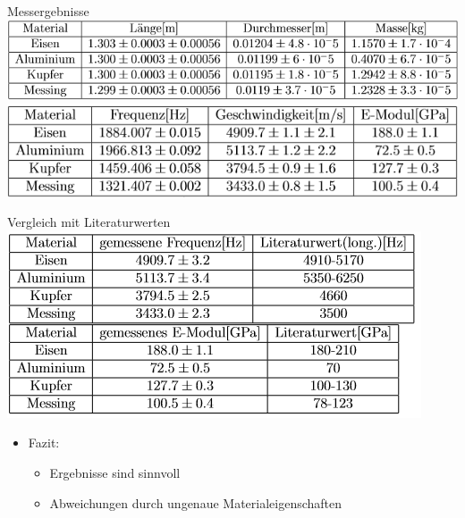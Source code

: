 \documentclass[12pt]{beamer}
\begin{document}
\begin{frame}{Messergebnisse}
\includegraphics[width=\linewidth,height=\textheight,keepaspectratio]{Bilder/Material_Metalle.PNG}\\
\includegraphics[width=\linewidth,height=\textheight,keepaspectratio]{Bilder/Ergebnisse_Metall.PNG}
\end{frame}

\begin{frame}{Vergleich mit Literaturwerten}
\includegraphics[width=\linewidth,height=\textheight,keepaspectratio]{Bilder/Literaturwerte_Metalle.PNG}\\
\begin{itemize}
\item Fazit:
\begin{itemize}
\item Ergebnisse sind sinnvoll
\item Abweichungen durch ungenaue Materialeigenschaften
\end{itemize}
\end{itemize}
\end{frame}




	
\end{document}
